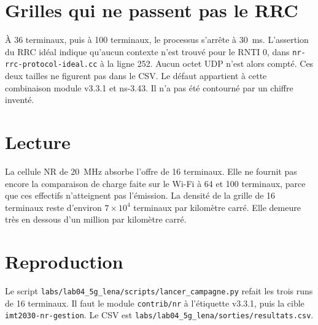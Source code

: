 \documentclass[11pt,a4paper]{article}
\begin{document}
\section{Grilles qui ne passent pas le RRC}

À 36 terminaux, puis à 100 terminaux, le processus s'arrête à 30~ms. L'assertion du RRC idéal indique qu'aucun contexte n'est trouvé pour le RNTI 0, dans \texttt{nr-rrc-protocol-ideal.cc} à la ligne 252. Aucun octet UDP n'est alors compté. Ces deux tailles ne figurent pas dans le CSV. Le défaut appartient à cette combinaison module v3.3.1 et ns-3.43. Il n'a pas été contourné par un chiffre inventé.

\section{Lecture}

La cellule NR de 20~MHz absorbe l'offre de 16 terminaux. Elle ne fournit pas encore la comparaison de charge faite sur le Wi-Fi à 64 et 100 terminaux, parce que ces effectifs n'atteignent pas l'émission. La densité de la grille de 16 terminaux reste d'environ $7\times 10^{4}$ terminaux par kilomètre carré. Elle demeure très en dessous d'un million par kilomètre carré.

\section{Reproduction}

Le script \texttt{labs/lab04\_5g\_lena/scripts/lancer\_campagne.py} refait les trois runs de 16 terminaux. Il faut le module \texttt{contrib/nr} à l'étiquette v3.3.1, puis la cible \texttt{imt2030-nr-gestion}. Le CSV est \texttt{labs/lab04\_5g\_lena/sorties/resultats.csv}.
\end{document}
